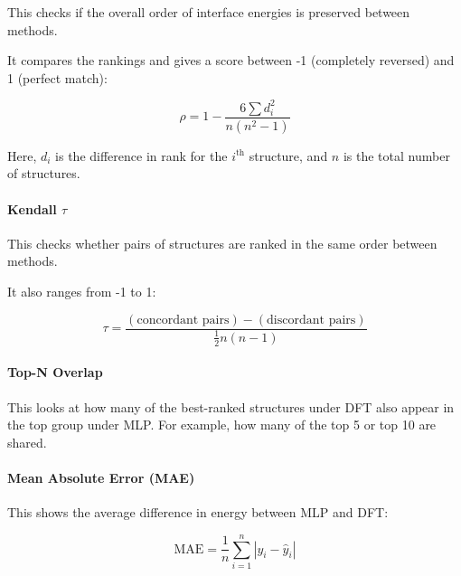 
This checks if the overall order of interface energies is preserved between methods.

It compares the rankings and gives a score between -1 (completely reversed) and 1 (perfect match):


\[
\rho = 1 - \frac{6 \sum d_i^2}{n(n^2 - 1)}
\]


Here, \( d_i \) is the difference in rank for the \( i^\text{th} \) structure, and \( n \) is the total number of
structures.


\paragraph{Kendall \( \tau \)}


This checks whether pairs of structures are ranked in the same order between methods.

It also ranges from -1 to 1:


\[
\tau = \frac{(\text{concordant pairs}) - (\text{discordant pairs})}{\frac{1}{2}n(n-1)}
\]


\paragraph{Top-N Overlap}


This looks at how many of the best-ranked structures under DFT also appear in the top group under MLP. For example, how
many of the top 5 or top 10 are shared.


\paragraph{Mean Absolute Error (MAE)}


This shows the average difference in energy between MLP and DFT:


\[
\text{MAE} = \frac{1}{n} \sum_{i=1}^{n} |y_i - \hat{y}_i|
\]


